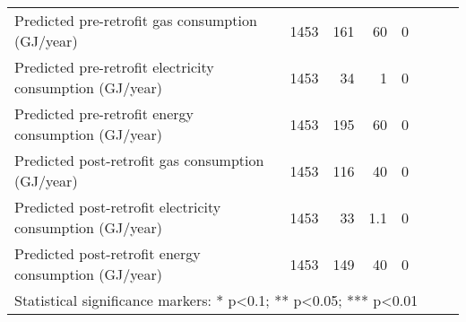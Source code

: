 \begin{table}[!htbp]
{\begin{tabular}{lrrrrrrl}
Predicted pre-retrofit gas consumption (GJ/year) & 1453 & 161 & 60 & 0 &  &  &  \\ 
Predicted pre-retrofit electricity consumption (GJ/year) & 1453 & 34 & 1 & 0 &  &  &  \\ 
Predicted pre-retrofit energy consumption (GJ/year) & 1453 & 195 & 60 & 0 &  &  &  \\ 
Predicted post-retrofit gas consumption (GJ/year) & 1453 & 116 & 40 & 0 &  &  &  \\ 
Predicted post-retrofit electricity consumption (GJ/year) & 1453 & 33 & 1.1 & 0 &  &  &  \\ 
Predicted post-retrofit energy consumption (GJ/year) & 1453 & 149 & 40 & 0 &  &  & \\ 
\hline
\hline
\multicolumn{8}{l}{Statistical significance markers: * p<0.1; ** p<0.05; *** p<0.01}\\ 
\end{tabular}
}
\end{table}

